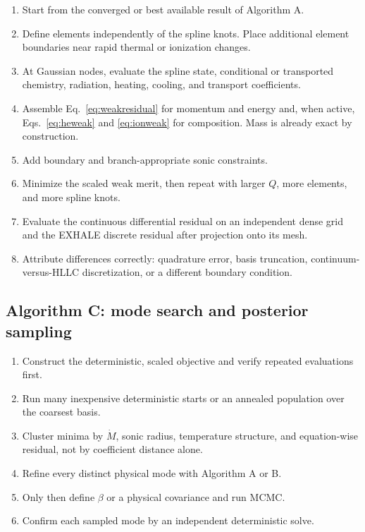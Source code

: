 \documentclass[english,a4paper]{my_memo}
\newcommand{\mdot}{\dot M}
\begin{document}
\begin{enumerate}
\item Start from the converged or best available result of Algorithm A.
\item Define elements independently of the spline knots.  Place additional
  element boundaries near rapid thermal or ionization changes.
\item At Gaussian nodes, evaluate the spline state, conditional or transported
  chemistry, radiation, heating, cooling, and transport coefficients.
\item Assemble Eq.~\eqref{eq:weakresidual} for momentum and energy and, when
  active, Eqs.~\eqref{eq:heweak} and \eqref{eq:ionweak} for composition.  Mass
  is already exact by construction.
\item Add boundary and branch-appropriate sonic constraints.
\item Minimize the scaled weak merit, then repeat with larger \(Q\), more
  elements, and more spline knots.
\item Evaluate the continuous differential residual on an independent dense
  grid and the EXHALE discrete residual after projection onto its mesh.
\item Attribute differences correctly: quadrature error, basis truncation,
  continuum-versus-HLLC discretization, or a different boundary condition.
\end{enumerate}

\subsection{Algorithm C: mode search and posterior sampling}

\begin{enumerate}
\item Construct the deterministic, scaled objective and verify repeated
  evaluations first.
\item Run many inexpensive deterministic starts or an annealed population over
  the coarsest basis.
\item Cluster minima by \(\mdot\), sonic radius, temperature structure, and
  equation-wise residual, not by coefficient distance alone.
\item Refine every distinct physical mode with Algorithm A or B.
\item Only then define \(\beta\) or a physical covariance and run MCMC.
\item Confirm each sampled mode by an independent deterministic solve.
\end{enumerate}
\end{document}

